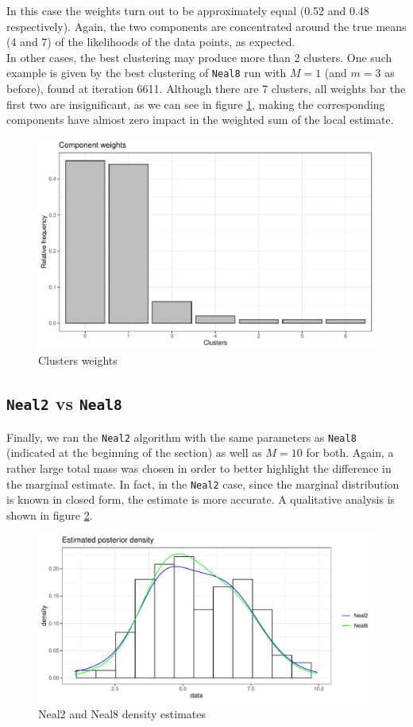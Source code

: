 In this case the weights turn out to be approximately equal (0.52 and 0.48 respectively).
Again, the two components are concentrated around the true means (4 and 7) of the likelihoods of the data points, as expected. \\
In other cases, the best clustering may produce more than 2 clusters.
One such example is given by the best clustering of \verb|Neal8| run with $M=1$ (and $m=3$ as before), found at iteration 6611.
Although there are 7 clusters, all weights bar the first two are insignificant, as we can see in figure \ref{fig:cluster_weigths}, making the corresponding components have almost zero impact in the weighted sum of the local estimate.

\clearpage

\begin{figure}[h]
	\centering
	\includegraphics[scale=0.4]{etc/barplotM1m3.pdf}
	\caption{Clusters weights}

	\label{fig:cluster_weigths}
	
\end{figure}



\subsection{\texttt{Neal2} vs \texttt{Neal8}}
Finally, we ran the \verb|Neal2| algorithm with the same parameters as \verb|Neal8| (indicated at the beginning of the section) as well as $M=10$ for both.
Again, a rather large total mass was chosen in order to better highlight the difference in the marginal estimate.
In fact, in the \verb|Neal2| case, since the marginal distribution is known in closed form, the estimate is more accurate. A qualitative analysis is shown in figure \ref{fig:neal2_neal8}.

\begin{figure}[h]
	\centering
	\includegraphics[scale=0.55]{etc/neal2_M10.pdf}
	\caption{Neal2 and Neal8 density estimates}

	\label{fig:neal2_neal8}
\end{figure}
